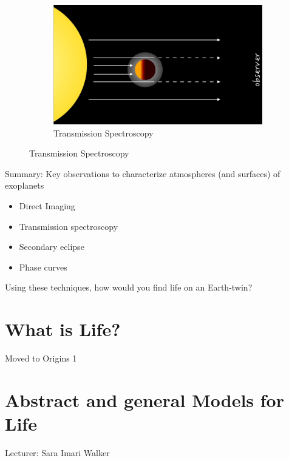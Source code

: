 \documentclass[]{article}
\begin{document}
\begin{figure}[H]
\begin{subfigure}[t]{0.3\textwidth}
	\end{subfigure}
	\begin{subfigure}[t]{0.3\textwidth}
		\caption{Transmission Spectroscopy}\label{fig:transiting:planets3}
		\includegraphics[width=\textwidth]{TransitingPlanets3}
	\end{subfigure}
\end{figure}
	

Summary: Key observations to characterize atmospheres (and surfaces) of exoplanets
\begin{itemize}
	\item Direct Imaging
	\item  Transmission spectroscopy
	\item  Secondary eclipse
	\item  Phase curves
\end{itemize}
Using these techniques, how would you find life on an Earth-twin?

\cite{sagan1993search}
\cite{kaltenegger2017characterize}
\cite{fujii2018exoplanet}

\cite{robinson2011earth}

\cite{deming2013infrared}
\cite{knutson2007map}

\section{What is Life?}

Moved to Origins 1



\section{Abstract and general Models for Life}

Lecturer: Sara Imari Walker
\end{document}
